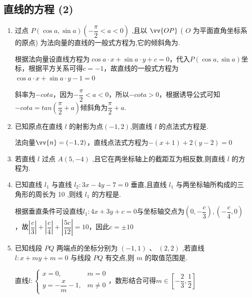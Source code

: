 \subsection*{直线的方程 (2)}
\begin{enumerate}
    \item 过点 $P\left( {\cos a,\sin a}\right) \left( {-\dfrac{\pi }{2} < a < 0}\right)$ ,且以 $\vv{OP}$ ( $O$ 为平面直角坐标系的原点) 为法向量的直线的一般式方程为,它的倾斜角为.
    \begin{jieda}
        根据法向量设直线方程为$\cos a \cdot x + \sin a \cdot y + c = 0$，代入$P\left( {\cos a,\sin a}\right)$坐标，根据平方关系可得$c = -1$，故直线的一般式方程为$\cos a \cdot x + \sin a \cdot y - 1 = 0$
        
        斜率为$-cota$，因为$-\dfrac{\pi }{2} < a < 0$，所以$-cota > 0$，根据诱导公式可知$-cota = tan\left(\dfrac{\pi}{2}+a\right)$倾斜角为$\dfrac{\pi}{2} + a$.
    \end{jieda}
    
    \item 已知原点在直线 $l$ 的射影为点$(-1,2)$,则直线 $l$ 的点法式方程是.
    \begin{jieda}
        法向量$\vv{n} = (-1,2)$，直线点法式方程为$-(x+1)+2(y-2) = 0$
    \end{jieda}
    
    \item 若直线 $l$ 过点 $A\left( {5, - 4}\right)$ ,且它在两坐标轴上的截距互为相反数,则直线 $l$ 的方程为.

    \item 已知直线 ${l}_{1}$ 与直线 ${l}_{2} : {3x} - {4y} - 7 = 0$ 垂直,且直线 ${l}_{1}$ 与两坐标轴所构成的三角形的周长为 10 ,则线 ${l}_{1}$ 的方程是.
    \begin{jieda}
        根据垂直条件可设直线$l_1: 4x+3y + c = 0$与坐标轴交点为$\left(0, -\dfrac{c}{3}\right), \left(-\dfrac{c}{4}, 0\right)$，故$\left|\dfrac{c}{3}\right|+\left|\dfrac{c}{4}\right|+\left|\dfrac{5c}{12}\right| = 10$，因此$c = \pm 10$
    \end{jieda}

    \item 已知线段 ${PQ}$ 两端点的坐标分别为 $\left( {-1,1}\right) \text{ 、 }\left( {2,2}\right)$ ,若直线 $l : x + {my} + m = 0$ 与线段 ${PQ}$ 有交点,则 $m$ 的取值范围是.
    \begin{jieda}
        直线$l: \left\{\begin{array}{ll}
             x = 0, & m = 0 \\
             y = -\dfrac{x}{m}-1, & m \neq 0
        \end{array}\right.$，数形结合可得$m\in \left[-\dfrac{2}{3}, \dfrac{1}{2}\right]$
    \end{jieda}


\end{enumerate}
